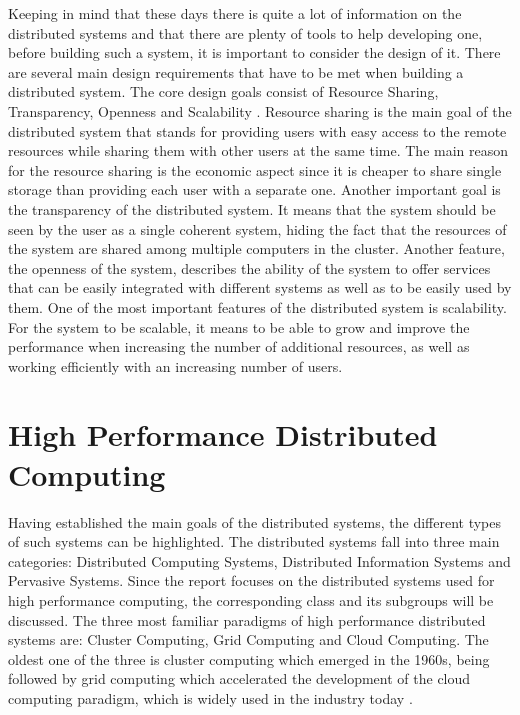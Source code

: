 \documentclass[10pt]{report}
\begin{document}
Keeping in mind that these days there is quite a lot of information on the distributed systems and that there are plenty of tools to help developing one, before building such a system, it is important to consider the design of it. There are several main design requirements that have to be met when building a distributed system. The core design goals consist of Resource Sharing, Transparency, Openness and Scalability \cite{geeks}. Resource sharing is the main goal of the distributed system that stands for providing users with easy access to the remote resources while sharing them with other users at the same time. The main reason for the resource sharing is the economic aspect since it is cheaper to share single storage than providing each user with a separate one. Another important goal is the transparency of the distributed system. It means that the system should be seen by the user as a single coherent system, hiding the fact that the resources of the system are shared among multiple computers in the cluster. Another feature, the openness of the system, describes the ability of the system to offer services that can be easily integrated with different systems as well as to be easily used by them. One of the most important features of the distributed system is scalability. For the system to be scalable, it means to be able to grow and improve the performance when increasing the number of additional resources, as well as working efficiently with an increasing number of users.

\section{High Performance Distributed Computing}


Having established the main goals of the distributed systems, the different types of such systems can be highlighted. The distributed systems fall into three main categories: Distributed Computing Systems, Distributed Information Systems and Pervasive Systems. Since the report focuses on the distributed systems used for high performance computing, the corresponding class and its subgroups will be discussed. The three most familiar paradigms of high performance distributed systems are: Cluster Computing, Grid Computing and Cloud Computing. The oldest one of the three is cluster computing which emerged in the 1960s, being followed by grid computing which accelerated the development of the cloud computing paradigm, which is widely used in the industry today \cite{paradigms}.
\end{document}
